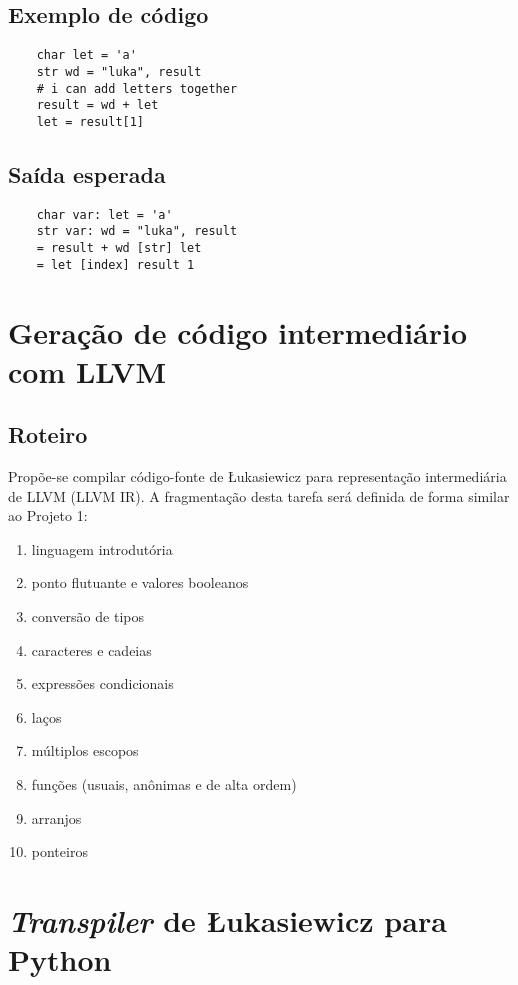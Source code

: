 \documentclass{article}
\newenvironment{smallenum}{
    \vspace{-1mm}
    \begin{enumerate}[label=\roman*.]
    \setlength{\parskip}{0pt}
    \setlength{\itemsep}{2pt}
}{
    \vspace{-2mm}
    \end{enumerate}
}
\begin{document}
\subsection{Exemplo de código}

\begin{verbatim}
    char let = 'a'
    str wd = "luka", result
    # i can add letters together
    result = wd + let
    let = result[1]
\end{verbatim}

\subsection{Saída esperada}

\begin{verbatim}
    char var: let = 'a'
    str var: wd = "luka", result
    = result + wd [str] let
    = let [index] result 1
\end{verbatim}

\section{Geração de código intermediário com LLVM}

\subsection{Roteiro}
Propõe-se compilar código-fonte de Łukasiewicz para representação intermediária
de LLVM (LLVM IR). A fragmentação desta tarefa será definida de forma similar
ao Projeto 1:

\begin{smallenum}
    \item linguagem introdutória
    \item ponto flutuante e valores booleanos
    \item conversão de tipos
    \item caracteres e cadeias
    \item expressões condicionais
    \item laços
    \item múltiplos escopos
    \item funções (usuais, anônimas e de alta ordem)
    \item arranjos
    \item ponteiros
\end{smallenum}

\section{\emph{Transpiler} de Łukasiewicz para Python}
\end{document}
